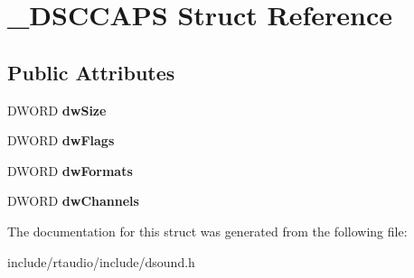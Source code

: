 \hypertarget{struct___d_s_c_c_a_p_s}{}\section{\+\_\+\+D\+S\+C\+C\+A\+PS Struct Reference}
\label{struct___d_s_c_c_a_p_s}
\subsection*{Public Attributes}
\begin{DoxyCompactItemize}
\item 
D\+W\+O\+RD {\bfseries dw\+Size}\hypertarget{struct___d_s_c_c_a_p_s_a2f7d12d23c40bb1ac9eb42c4a80b4025}{}\label{struct___d_s_c_c_a_p_s_a2f7d12d23c40bb1ac9eb42c4a80b4025}

\item 
D\+W\+O\+RD {\bfseries dw\+Flags}\hypertarget{struct___d_s_c_c_a_p_s_ac09c3eab47c8aa247d03af05e0156bdf}{}\label{struct___d_s_c_c_a_p_s_ac09c3eab47c8aa247d03af05e0156bdf}

\item 
D\+W\+O\+RD {\bfseries dw\+Formats}\hypertarget{struct___d_s_c_c_a_p_s_ac0558c7587efc5f6e5ff29731005c6d9}{}\label{struct___d_s_c_c_a_p_s_ac0558c7587efc5f6e5ff29731005c6d9}

\item 
D\+W\+O\+RD {\bfseries dw\+Channels}\hypertarget{struct___d_s_c_c_a_p_s_a21c93e889bcad7aaa87ee5c810a43154}{}\label{struct___d_s_c_c_a_p_s_a21c93e889bcad7aaa87ee5c810a43154}

\end{DoxyCompactItemize}


The documentation for this struct was generated from the following file\+:\begin{DoxyCompactItemize}
\item 
include/rtaudio/include/dsound.\+h\end{DoxyCompactItemize}
